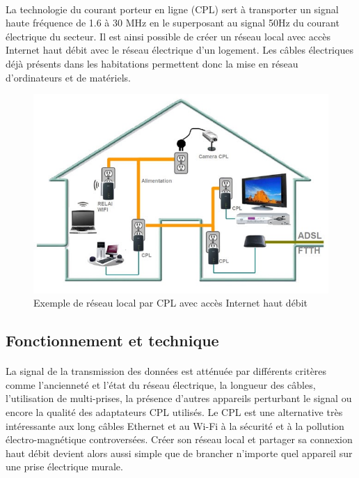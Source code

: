             \paragraph{}
La technologie du courant porteur en ligne (CPL) sert à transporter un signal haute fréquence de 1.6 à 30 MHz en le superposant au signal 50Hz du courant électrique du secteur.
Il est ainsi possible de créer un réseau local avec accès Internet haut débit avec le réseau électrique d'un logement.
Les câbles électriques déjà présents dans les habitations permettent donc la mise en réseau d'ordinateurs et de matériels.
    \begin{figure}[h]
        \begin{center}
            \includegraphics[scale=0.5]{./images/cpl/exempleReseauLocalCPL.jpg}
        \end{center}
            \caption{ Exemple de réseau local par CPL avec accès Internet haut débit } %
            \label{Exemple liens actuels avec CPL}
    \end{figure}

        \subsection{Fonctionnement et technique}
            \paragraph{}
La signal de la transmission des données est atténuée par différents critères comme l’ancienneté et l'état du réseau électrique, la longueur des câbles, l'utilisation de multi-prises, la présence d'autres appareils perturbant le signal ou encore la qualité des adaptateurs CPL utilisés.
Le CPL est une alternative très intéressante aux long câbles Ethernet et au Wi-Fi à la sécurité et à la pollution électro-magnétique controversées.
Créer son réseau local et partager sa connexion haut débit devient alors aussi simple que de brancher n'importe quel appareil sur une prise électrique murale.

